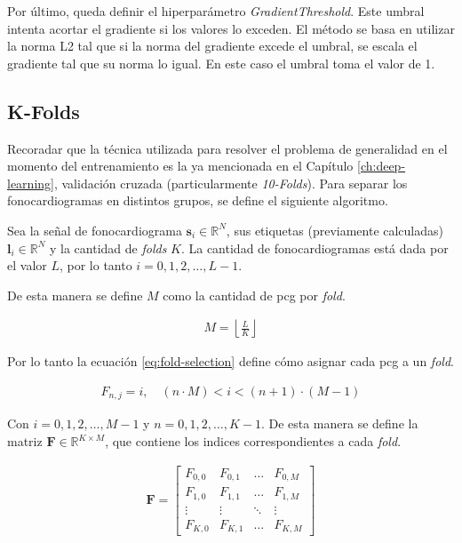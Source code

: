 \indent Por último, queda definir el hiperparámetro \textit{GradientThreshold}. Este umbral intenta acortar el
gradiente si los valores lo exceden. El método se basa en utilizar la norma L2 tal que si la norma del gradiente
excede el umbral, se escala el gradiente tal que su norma lo igual. En este caso el umbral toma el valor de 1.

\subsection{K-Folds} \label{subsec:k-folds}

\indent Recoradar que la técnica utilizada para resolver el problema de generalidad en el momento del entrenamiento
es la ya mencionada en el Capítulo \ref{ch:deep-learning}, validación cruzada (particularmente
\textit{10-Folds}). Para separar los fonocardiogramas en distintos grupos, se define el siguiente algoritmo. \bigskip

\indent Sea la señal de fonocardiograma $\mathbf{s}_i \in \mathbb{R}^N$, sus etiquetas (previamente calculadas)
$\mathbf{l}_i \in \mathbb{R}^N$ y la cantidad de \textit{folds} $K$. La cantidad de fonocardiogramas está dada por
el valor $L$, por lo tanto $i = 0,1,2,\dots,L-1$. \bigskip

\indent De esta manera se define $M$ como la cantidad de \gls{pcg} por \textit{fold}.

\begin{align}
  M = \left\lfloor \frac{L}{K} \right\rfloor
\end{align}

\indent Por lo tanto la ecuación \ref{eq:fold-selection} define cómo asignar cada \gls{pcg} a un \textit{fold}.

\begin{align} \label{eq:fold-selection}
 F_{n,j} = i, \quad (n \cdot M) < i < (n+1) \cdot (M-1)
\end{align}

\indent Con $i=0,1,2,\dots,M-1$ y $n = 0,1,2,\dots,K-1$. De esta manera se define la matriz $\bm{F} \in
\mathbb{R}^{K \times M}$, que contiene los indices correspondientes a cada \textit{fold}.

\begin{align}
  \bm{F} = \left[\begin{array}{ccccc}
    F_{0,0} & F_{0,1} & \dots & F_{0,M} \\
    F_{1,0} & F_{1,1} & \dots & F_{1,M} \\
    \vdots  & \vdots  & \ddots & \vdots \\
    F_{K,0} & F_{K,1} & \dots & F_{K,M}
  \end{array}\right]
\end{align}

